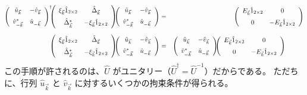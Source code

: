 \documentclass[uplatex,a4j,12pt,dvipdfmx]{jsarticle}
\begin{document}
\begin{eqnarray}
	\left(
	\begin{array}{cc}
		\hat{u}_{\vec{k}}       & - \hat{v}_{\vec{k}} \\[2mm]
		\hat{v}_{- \vec{k}}^{*} & \hat{u}_{-\vec{k}}
	\end{array}
	\right)^{\dagger}
	\!\!\!
	\left(
	\begin{array}{cc}
			\xi_{\vec{k}} \hat{1}_{2 \times 2} & \hat{\Delta}_{\vec{k}}               \\[2mm]
			\hat{\Delta}^{*}_{\vec{k}}         & - \xi_{\vec{k}} \hat{1}_{2 \times 2}
		\end{array}
	\right)
	\!\!\!
	\left(
	\begin{array}{cc}
			\hat{u}_{\vec{k}}       & - \hat{v}_{\vec{k}} \\[2mm]
			\hat{v}_{- \vec{k}}^{*} & \hat{u}_{-\vec{k}}
		\end{array}
	\right)
	&=&
	\left(
	\begin{array}{cc}
			E_{\vec{k}} \hat{1}_{2 \times 2} & 0                                  \\[2mm]
			0                                & - E_{\vec{k}} \hat{1}_{2 \times 2}
		\end{array}
	\right)
	\\[2mm]
	\left(
	\begin{array}{cc}
			\xi_{\vec{k}} \hat{1}_{2 \times 2} & \hat{\Delta}_{\vec{k}}               \\[2mm]
			\hat{\Delta}^{*}_{\vec{k}}         & - \xi_{\vec{k}} \hat{1}_{2 \times 2}
		\end{array}
	\right)
	\!\!\!
	\left(
	\begin{array}{cc}
			\hat{u}_{\vec{k}}       & - \hat{v}_{\vec{k}} \\[2mm]
			\hat{v}_{- \vec{k}}^{*} & \hat{u}_{-\vec{k}}
		\end{array}
	\right)
	&=&
	\left(
	\begin{array}{cc}
			\hat{u}_{\vec{k}}       & - \hat{v}_{\vec{k}} \\[2mm]
			\hat{v}_{- \vec{k}}^{*} & \hat{u}_{-\vec{k}}
		\end{array}
	\right)
	\!\!\!
	\left(
	\begin{array}{cc}
			E_{\vec{k}} \hat{1}_{2 \times 2} & 0                                  \\[2mm]
			0                                & - E_{\vec{k}} \hat{1}_{2 \times 2}
		\end{array}
	\right)
	\hspace{10mm}
\end{eqnarray}
%
この手順が許されるのは、$\hat{U}$ がユニタリー（$\hat{U}^{\dagger} = \hat{U}^{-1}$）だからである。
ただちに、行列 $\hat{u}_{\vec{k}}$ と $\hat{v}_{\vec{k}}$ に対するいくつかの拘束条件が得られる。
\end{document}
